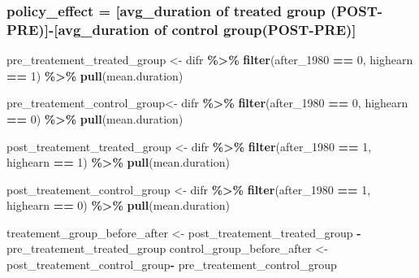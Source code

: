 \documentclass[
]{article}
\newenvironment{Shaded}{\begin{snugshade}}{\end{snugshade}}
\newcommand{\DecValTok}[1]{\textcolor[rgb]{0.00,0.00,0.81}{#1}}
\newcommand{\FunctionTok}[1]{\textcolor[rgb]{0.13,0.29,0.53}{\textbf{#1}}}
\newcommand{\NormalTok}[1]{#1}
\newcommand{\OtherTok}[1]{\textcolor[rgb]{0.56,0.35,0.01}{#1}}
\newcommand{\SpecialCharTok}[1]{\textcolor[rgb]{0.81,0.36,0.00}{\textbf{#1}}}
\begin{document}
\subsubsection{policy\_effect = {[}avg\_duration of treated group
(POST-PRE){]}-{[}avg\_duration of control
group(POST-PRE){]}}\label{policy_effect-avg_duration-of-treated-group-post-pre-avg_duration-of-control-grouppost-pre}

\begin{Shaded}
\begin{Highlighting}[]
\NormalTok{pre\_treatement\_treated\_group }\OtherTok{\textless{}{-}}\NormalTok{ difr }\SpecialCharTok{\%\textgreater{}\%} 
  \FunctionTok{filter}\NormalTok{(after\_1980 }\SpecialCharTok{==} \DecValTok{0}\NormalTok{, highearn }\SpecialCharTok{==} \DecValTok{1}\NormalTok{) }\SpecialCharTok{\%\textgreater{}\%} 
  \FunctionTok{pull}\NormalTok{(mean.duration)}

\NormalTok{pre\_treatement\_control\_group}\OtherTok{\textless{}{-}}\NormalTok{ difr }\SpecialCharTok{\%\textgreater{}\%} 
  \FunctionTok{filter}\NormalTok{(after\_1980 }\SpecialCharTok{==} \DecValTok{0}\NormalTok{, highearn }\SpecialCharTok{==} \DecValTok{0}\NormalTok{) }\SpecialCharTok{\%\textgreater{}\%} 
  \FunctionTok{pull}\NormalTok{(mean.duration)}

\NormalTok{post\_treatement\_treated\_group }\OtherTok{\textless{}{-}}\NormalTok{ difr }\SpecialCharTok{\%\textgreater{}\%} 
  \FunctionTok{filter}\NormalTok{(after\_1980 }\SpecialCharTok{==} \DecValTok{1}\NormalTok{, highearn }\SpecialCharTok{==} \DecValTok{1}\NormalTok{) }\SpecialCharTok{\%\textgreater{}\%} 
  \FunctionTok{pull}\NormalTok{(mean.duration)}

\NormalTok{post\_treatement\_control\_group }\OtherTok{\textless{}{-}}\NormalTok{ difr }\SpecialCharTok{\%\textgreater{}\%} 
  \FunctionTok{filter}\NormalTok{(after\_1980 }\SpecialCharTok{==} \DecValTok{1}\NormalTok{, highearn }\SpecialCharTok{==} \DecValTok{0}\NormalTok{) }\SpecialCharTok{\%\textgreater{}\%} 
  \FunctionTok{pull}\NormalTok{(mean.duration)}
\end{Highlighting}
\end{Shaded}

\begin{Shaded}
\begin{Highlighting}[]
\NormalTok{treatement\_group\_before\_after }\OtherTok{\textless{}{-}}\NormalTok{ post\_treatement\_treated\_group }\SpecialCharTok{{-}}\NormalTok{ pre\_treatement\_treated\_group}
\NormalTok{control\_group\_before\_after    }\OtherTok{\textless{}{-}}\NormalTok{post\_treatement\_control\_group}\SpecialCharTok{{-}}\NormalTok{ pre\_treatement\_control\_group}
\end{Highlighting}
\end{Shaded}
\end{document}
